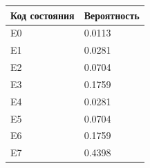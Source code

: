 \begin{tabular}{|l|l|}
\hline
Код состояния & Вероятность \\ \hline
E0            & 0.0113      \\ \hline
E1            & 0.0281      \\ \hline
E2            & 0.0704      \\ \hline
E3            & 0.1759      \\ \hline
E4            & 0.0281      \\ \hline
E5            & 0.0704      \\ \hline
E6            & 0.1759      \\ \hline
E7            & 0.4398      \\ \hline
\end{tabular}

